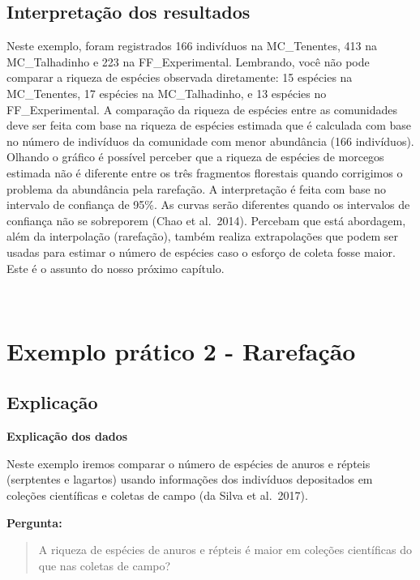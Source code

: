 \documentclass[
]{book}
\begin{document}
\hypertarget{interpretauxe7uxe3o-dos-resultados}{%
\subsection{Interpretação dos resultados}\label{interpretauxe7uxe3o-dos-resultados}}

Neste exemplo, foram registrados 166 indivíduos na MC\_Tenentes, 413 na MC\_Talhadinho e 223 na FF\_Experimental. Lembrando, você não pode comparar a riqueza de espécies observada diretamente: 15 espécies na MC\_Tenentes, 17 espécies na MC\_Talhadinho, e 13 espécies no FF\_Experimental. A comparação da riqueza de espécies entre as comunidades deve ser feita com base na riqueza de espécies estimada que é calculada com base no número de indivíduos da comunidade com menor abundância (166 indivíduos). Olhando o gráfico é possível perceber que a riqueza de espécies de morcegos estimada não é diferente entre os três fragmentos florestais quando corrigimos o problema da abundância pela rarefação. A interpretação é feita com base no intervalo de confiança de 95\%. As curvas serão diferentes quando os intervalos de confiança não se sobreporem (Chao et al.~2014). Percebam que está abordagem, além da interpolação (rarefação), também realiza extrapolações que podem ser usadas para estimar o número de espécies caso o esforço de coleta fosse maior. Este é o assunto do nosso próximo capítulo.

~

\hypertarget{exemplo-pruxe1tico-2---rarefauxe7uxe3o}{%
\section{Exemplo prático 2 - Rarefação}\label{exemplo-pruxe1tico-2---rarefauxe7uxe3o}}

\hypertarget{explicauxe7uxe3o-1}{%
\subsection{Explicação}\label{explicauxe7uxe3o-1}}

\textbf{Explicação dos dados}

Neste exemplo iremos comparar o número de espécies de anuros e répteis (serptentes e lagartos) usando informações dos indivíduos depositados em coleções científicas e coletas de campo (da Silva et al.~2017).

\textbf{Pergunta:}

\begin{quote}
A riqueza de espécies de anuros e répteis é maior em coleções científicas do que nas coletas de campo?
\end{quote}
\end{document}
